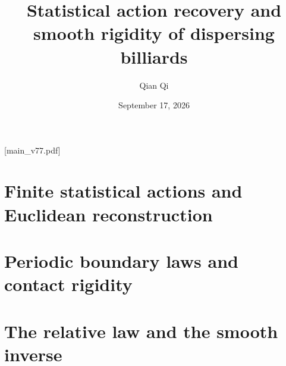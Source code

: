 
[main_v77.pdf]
\title[Statistical actions and smooth rigidity]{Statistical action recovery and smooth rigidity of dispersing billiards}
\author{Qian Qi}
\date{September 17, 2026}


\begin{abstract}



\end{abstract}
\makeatletter
\def\@setabstracta{%
  \ifvoid\abstractbox\else
    \skip@20\p@ \advance\skip@-\lastskip
    \advance\skip@-\baselineskip \vskip\skip@
    \unvbox\abstractbox \prevdepth\z@
  \fi}
\makeatother
\maketitle
\setcounter{tocdepth}{1}
\tableofcontents
\part{Finite statistical actions and Euclidean reconstruction}







\part{Periodic boundary laws and contact rigidity}

\part{The relative law and the smooth inverse}







